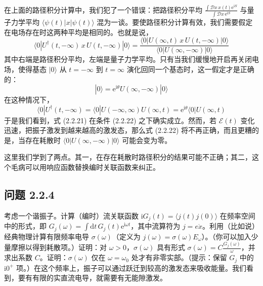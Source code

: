 
在上面的路径积分计算中，我们犯了一个错误：把路径积分平均 $\frac{\int \mathcal{D}x\, x(t)\mathrm{e}^{\mathrm{i}S}}{\int \mathcal{D}x\, \mathrm{e}^{\mathrm{i}S}}$ 与量子力学平均 $\langle\psi(t)|x|\psi(t)\rangle$ 混为一谈。要使路径积分计算有效，我们需要假定在电场存在时这两种平均是相同的。也就是说，
\begin{equation*}
\langle 0|U^{\dagger}(t,-\infty)\, x\, U(t,-\infty)|0\rangle = \frac{\langle 0|U(\infty,t)\, x\, U(t,-\infty)|0\rangle}{\langle 0|U(\infty,-\infty)|0\rangle} \tag{2.2.21}
\end{equation*}
其中右端是路径积分平均，左端是量子力学平均。只有当我们缓慢地开启再关闭电场，使得基态 $|0\rangle$ 从 $t=-\infty$ 到 $t=\infty$ 演化回同一个基态时，这一假定才是正确的：
\begin{equation*}
|0\rangle = \mathrm{e}^{\mathrm{i}\theta} U(\infty,-\infty)|0\rangle \tag{2.2.22}
\end{equation*}
在这种情况下，
\begin{equation*}
\langle 0|U^{\dagger}(t,-\infty) = \langle 0|U(-\infty,\infty)U(\infty,t) = \mathrm{e}^{\mathrm{i}\theta}\langle 0|U(\infty,t)
\end{equation*}
于是我们看到，式 (2.2.21) 在条件 (2.2.22) 之下确实成立。然而，若 $\mathcal{E}(t)$ 变化迅速，把振子激发到越来越高的激发态，那么式 (2.2.22) 将不再正确，而且更糟的是，当存在耗散时 $\langle 0|U(\infty,-\infty)|0\rangle$ 可能会变为零。

这里我们学到了两点。其一，在存在耗散时路径积分的结果可能不正确；其二，这个毛病可以用响应函数替换编时关联函数来纠正。

\subsection*{问题 2.2.4}

考虑一个谐振子。计算（编时）流关联函数 $\mathrm{i}G_j(t) = \langle j(t)j(0)\rangle$ 在频率空间中的形式，即 $G_j(\omega) = \int \mathrm{d}t\, G_j(t)\mathrm{e}^{\mathrm{i}\omega t}$，其中流算符为 $j = e\dot{x}$。利用（比如说）经典物理计算有限频率电导 $\sigma(\omega)$（定义为 $j(\omega) = \sigma(\omega)E_{\omega}$）。（你可以加入少量摩擦以得到耗散项。）证明：对 $\omega > 0$，$\sigma(\omega)$ 具有形式 $\sigma(\omega) = C\frac{G_j(\omega)}{\omega}$，并求出系数 $C$。证明：$\sigma(\omega)$ 仅在 $\omega = \omega_0$ 处才有非零实部。（提示：保留 $G_j$ 中的 $\mathrm{i}0^{+}$ 项。）在这个频率上，振子可以通过跃迁到较高的激发态来吸收能量。我们看到，要有有限的实直流电导，就需要有无能隙激发。

